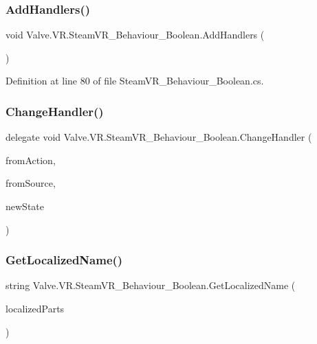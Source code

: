 \subsubsection{\texorpdfstring{AddHandlers()}{AddHandlers()}}
{\footnotesize\ttfamily void Valve.\+V\+R.\+Steam\+V\+R\+\_\+\+Behaviour\+\_\+\+Boolean.\+Add\+Handlers (\begin{DoxyParamCaption}{ }\end{DoxyParamCaption})\hspace{0.3cm}{\ttfamily [protected]}}



Definition at line 80 of file Steam\+V\+R\+\_\+\+Behaviour\+\_\+\+Boolean.\+cs.

\mbox{\label{class_valve_1_1_v_r_1_1_steam_v_r___behaviour___boolean_ac6747cdeceec4d24ddb39b4de05b1ca6}} 
\subsubsection{\texorpdfstring{ChangeHandler()}{ChangeHandler()}}
{\footnotesize\ttfamily delegate void Valve.\+V\+R.\+Steam\+V\+R\+\_\+\+Behaviour\+\_\+\+Boolean.\+Change\+Handler (\begin{DoxyParamCaption}\item[{\mbox{\hyperlink{class_valve_1_1_v_r_1_1_steam_v_r___behaviour___boolean}{Steam\+V\+R\+\_\+\+Behaviour\+\_\+\+Boolean}}}]{from\+Action,  }\item[{\mbox{\hyperlink{namespace_valve_1_1_v_r_a82e5bf501cc3aa155444ee3f0662853f}{Steam\+V\+R\+\_\+\+Input\+\_\+\+Sources}}}]{from\+Source,  }\item[{bool}]{new\+State }\end{DoxyParamCaption})}

\mbox{\label{class_valve_1_1_v_r_1_1_steam_v_r___behaviour___boolean_a971bb30542fc5f5da959fb951afdecbd}} 
\subsubsection{\texorpdfstring{GetLocalizedName()}{GetLocalizedName()}}
{\footnotesize\ttfamily string Valve.\+V\+R.\+Steam\+V\+R\+\_\+\+Behaviour\+\_\+\+Boolean.\+Get\+Localized\+Name (\begin{DoxyParamCaption}\item[{params \mbox{\hyperlink{namespace_valve_1_1_v_r_a05e76187bbc5846b9bfb44f6acf13912}{E\+V\+R\+Input\+String\+Bits}} \mbox{[}$\,$\mbox{]}}]{localized\+Parts }\end{DoxyParamCaption})}



